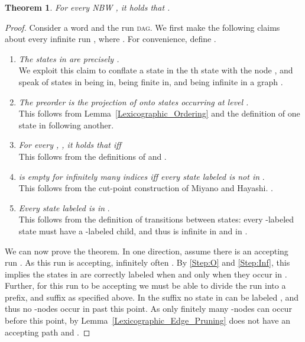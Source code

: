 \documentclass{LMCS}
\newcommand{\DAG}{\textsc{dag}\xspace}
\newtheorem{theorem}{Theorem}[section]
\begin{document}
\begin{theorem}\label{Slice_Complement}
For every NBW , it holds that .
\end{theorem}
\begin{proof}
\cbstart
Consider a word  and the run \DAG . We first make the following claims
about every infinite run , where
.  For convenience, define
. 
\begin{enumerate}[(1)]

\item\label{Step:S} \textit{The states in  are precisely .}\\
We exploit this claim to conflate a state  in the th state with the node ,
and speak of states in  being in, being finite in, and being infinite in a graph . 

\item\label{Step:Preorder} \textit{The preorder  is the projection of 
onto states occurring at level .} \\This follows from Lemma~\ref{Lexicographic_Ordering}
and the definition of one state in  following another.

\item\label{Step:Transitions} \textit{For every , , it holds that  iff }\\
This follows from the definitions of  and . 

\item\label{Step:O} \textit{ is empty for infinitely many indices
   iff every state labeled  is not in }.\\ This
  follows from the cut-point construction of Miyano and
  Hayashi. \cite{MH84}.

\item\label{Step:Inf} \textit{Every state labeled  is in }.\\
This follows from the definition of transitions between states: every -labeled state must
have a -labeled child, and thus is infinite in  and in .
\end{enumerate}

\noindent We can now prove the theorem. In one direction, assume there is an accepting run . As this run is accepting, infinitely often . By \ref{Step:O} and
\ref{Step:Inf}, this implies the states in  are correctly labeled  when and only when they occur
in .  Further, for this run to be accepting we must be able to divide the run into a prefix,
and suffix as specified above. In the suffix no state in  can be
labeled , and thus no -nodes occur in  past this point. As only finitely many
-nodes can occur before this point, by Lemma~\ref{Lexicographic_Edge_Pruning}  does not have
an accepting path and .


\end{proof}
\end{document}
